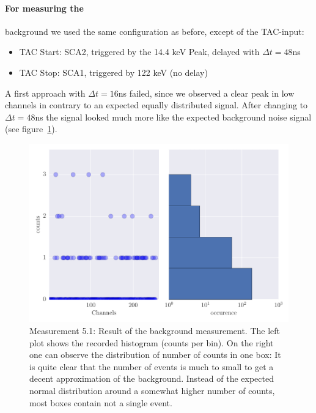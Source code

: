 \paragraph{For measuring the}
background we used the same configuration as before, except of the TAC-input:
\begin{itemize}
    \item TAC Start: SCA2, triggered by the 14.4 keV Peak, delayed with $\Delta t = 48$ns
    \item TAC Stop: SCA1, triggered by 122 keV (no delay)
\end{itemize}
A first approach with $\Delta t = 16$ns failed, since we observed a clear peak in low channels in contrary
to an expected equally distributed signal. After changing to $\Delta t=48$ns the signal looked much more 
like the expected background noise signal (see figure~\ref{fig:5_1}).
\begin{figure}[htpb]
    \centering
    \includegraphics[width=1.0\linewidth]{analysis/figures/plot5_1_hist}
    \caption{
        Measurement 5.1: Result of the background measurement. 
        The left plot shows the recorded histogram (counts per bin). 
        On the right one can observe the distribution of number of counts 
        in one box: It is quite clear that the number of events is much to small 
        to get a decent approximation of the background. Instead of the expected 
        normal distribution around a somewhat higher number of counts, most boxes 
        contain not a single event. 
        }
    \label{fig:5_1}
\end{figure}

\clearpage

